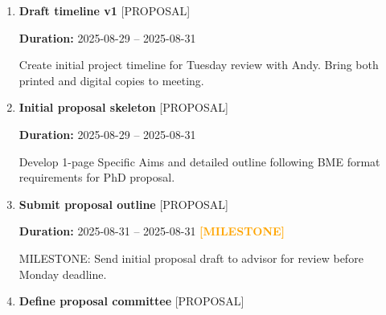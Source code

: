 \documentclass[landscape,a4paper]{article}
\begin{document}
\begin{enumerate}[leftmargin=1.5cm, itemsep=1em]

    \item \textcolor{researchcore}{\textbf{\large Draft timeline v1}}
          \hfill \textcolor{black!60}{\small [PROPOSAL]}
          
          \vspace{0.2em}
          \textcolor{black!70}{\textbf{Duration:} 2025-08-29 -- 2025-08-31}

          \vspace{0.4em}
          \begin{minipage}[t]{0.9\textwidth}
          \textcolor{black!85}{Create initial project timeline for Tuesday review with Andy. Bring both printed and digital copies to meeting.}
          \end{minipage}


    \item \textcolor{researchcore}{\textbf{\large Initial proposal skeleton}}
          \hfill \textcolor{black!60}{\small [PROPOSAL]}
          
          \vspace{0.2em}
          \textcolor{black!70}{\textbf{Duration:} 2025-08-29 -- 2025-08-31}

          \vspace{0.4em}
          \begin{minipage}[t]{0.9\textwidth}
          \textcolor{black!85}{Develop 1-page Specific Aims and detailed outline following BME format requirements for PhD proposal.}
          \end{minipage}


    \item \textcolor{researchcore}{\textbf{\large Submit proposal outline}}
          \hfill \textcolor{black!60}{\small [PROPOSAL]}
          
          \vspace{0.2em}
          \textcolor{black!70}{\textbf{Duration:} 2025-08-31 -- 2025-08-31}
          \textcolor{orange}{\textbf{ [MILESTONE]}}\n
          \vspace{0.4em}
          \begin{minipage}[t]{0.9\textwidth}
          \textcolor{black!85}{MILESTONE: Send initial proposal draft to advisor for review before Monday deadline.}
          \end{minipage}


    \item \textcolor{researchcore}{\textbf{\large Define proposal committee}}
          \hfill \textcolor{black!60}{\small [PROPOSAL]}
          

\end{enumerate}
\end{document}
